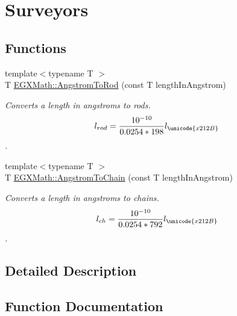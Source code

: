 \hypertarget{group___e_g_x_math-_conversions-_length_conversions-_non-_s_i-_angstrom-_surveyors}{}\section{Surveyors}
\label{group___e_g_x_math-_conversions-_length_conversions-_non-_s_i-_angstrom-_surveyors}
\subsection*{Functions}
\begin{DoxyCompactItemize}
\item 
{\footnotesize template$<$typename T $>$ }\\T \mbox{\hyperlink{group___e_g_x_math-_conversions-_length_conversions-_non-_s_i-_angstrom-_surveyors_gaf6080801cd8901dc21f80eed4ec3e421}{E\+G\+X\+Math\+::\+Angstrom\+To\+Rod}} (const T length\+In\+Angstrom)
\begin{DoxyCompactList}\small\item\em Converts a length in angstroms to rods. \[ l_{rod}= \frac{10^{-10}}{0.0254 * 198} l_{\unicode{x212B}} \]. \end{DoxyCompactList}\item 
{\footnotesize template$<$typename T $>$ }\\T \mbox{\hyperlink{group___e_g_x_math-_conversions-_length_conversions-_non-_s_i-_angstrom-_surveyors_ga76c09fcaebaf5049097b7d555c3f2f49}{E\+G\+X\+Math\+::\+Angstrom\+To\+Chain}} (const T length\+In\+Angstrom)
\begin{DoxyCompactList}\small\item\em Converts a length in angstroms to chains. \[ l_{ch}= \frac{10^{-10}}{0.0254 * 792} l_{\unicode{x212B}} \]. \end{DoxyCompactList}\end{DoxyCompactItemize}


\subsection{Detailed Description}


\subsection{Function Documentation}
\mbox{\label{group___e_g_x_math-_conversions-_length_conversions-_non-_s_i-_angstrom-_surveyors_ga76c09fcaebaf5049097b7d555c3f2f49}} 
